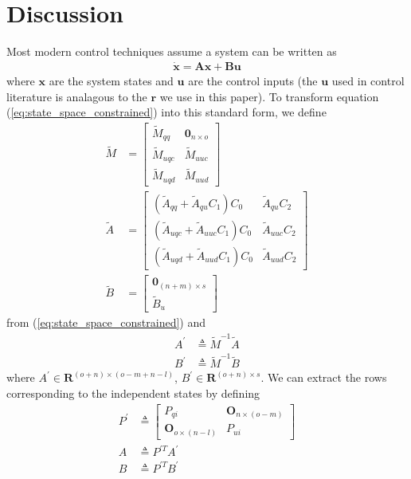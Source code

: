 \documentclass[smallcondensed,final]{svjour3}                     %
\begin{document}
\section{Discussion}
\label{sec:discussion}
Most modern control techniques assume a system can be written as
\begin{align}
\dot{\mathbf{x}} = \mathbf{A}\mathbf{x} + \mathbf{B}\mathbf{u}
\end{align}
where $\mathbf{x}$ are the system states and $\mathbf{u}$ are the control
inputs (the $\mathbf{u}$ used in control literature is analagous to the
$\mathbf{r}$ we use in this paper).  To transform equation
(\ref{eq:state_space_constrained}) into this standard form, we define
\begin{align}
\tilde{M} &=
\left[
\begin{array}{cc}
  \tilde{M}_{qq} & \bm{0}_{n \times o} \\
  \tilde{M}_{uqc} & \tilde{M}_{uuc} \\
  \tilde{M}_{uqd} & \tilde{M}_{uud}
\end{array}
\right]\\
\tilde{A} &=
   \left[
     \begin{array}{cc}
       (\tilde{A}_{qq} + \tilde{A}_{qu} C_1 ) C_0 & \tilde{A}_{qu} C_2 \\
       (\tilde{A}_{uqc} + \tilde{A}_{uuc} C_1 ) C_0 & \tilde{A}_{uuc} C_2\\
       (\tilde{A}_{uqd} + \tilde{A}_{uud} C_1 ) C_0 & \tilde{A}_{uud} C_2
     \end{array}
   \right]\\
\tilde{B} &= 
    \left[
      \begin{array}{c}
        \bm{0}_{(n+m) \times s} \\
        \tilde{B}_{u}
      \end{array}
    \right]
\end{align}
from (\ref{eq:state_space_constrained}) and
\begin{align}
  \label{eq:A_prime}
    A^\prime &\triangleq \tilde{M}^{-1} \tilde{A} \\
  \label{eq:B_prime}
    B^\prime &\triangleq \tilde{M}^{-1} \tilde{B}
\end{align}
where  $A^\prime \in \bm{R}^{(o + n) \times (o - m + n -l)}$, $B^\prime \in
\bm{R}^{(o + n) \times s}$.  We can extract the rows corresponding to the
independent states by defining
\begin{align}
  \label{eq:P_prime}
    P^\prime &\triangleq \begin{bmatrix}
        P_{qi} & \bm{O}_{n \times (o - m)} \\
        \bm{O}_{o \times (n - l)} & P_{ui}
    \end{bmatrix} \\
  \label{eq:A}
    A &\triangleq P^{\prime T} A^\prime \\
  \label{eq:B}
    B &\triangleq P^{\prime T} B^\prime
\end{align}
\end{document}
